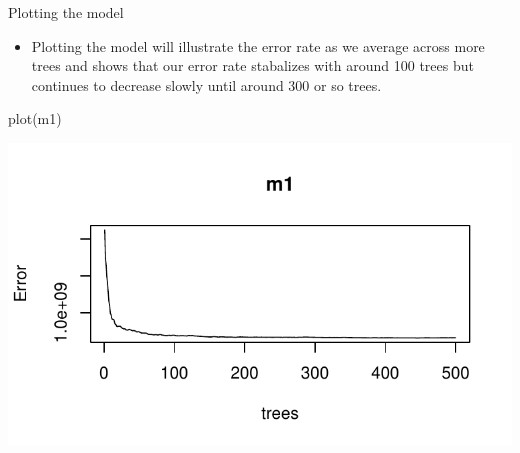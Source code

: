 \documentclass[10pt,ignorenonframetext,]{beamer}
\newenvironment{Shaded}{}{}
\newcommand{\KeywordTok}[1]{\textcolor[rgb]{0.00,0.00,1.00}{#1}}
\newcommand{\NormalTok}[1]{#1}
\providecommand{\tightlist}{%
  \setlength{\itemsep}{0pt}\setlength{\parskip}{0pt}}
\begin{document}
\begin{frame}[fragile]{Plotting the model}

\begin{itemize}
\tightlist
\item
  Plotting the model will illustrate the error rate as we average across
  more trees and shows that our error rate stabalizes with around 100
  trees but continues to decrease slowly until around 300 or so trees.
\end{itemize}

\begin{Shaded}
\begin{Highlighting}[]
\KeywordTok{plot}\NormalTok{(m1)}
\end{Highlighting}
\end{Shaded}

\includegraphics{c2_random_forests_files/figure-beamer/unnamed-chunk-5-1.pdf}

\end{frame}
\end{document}
